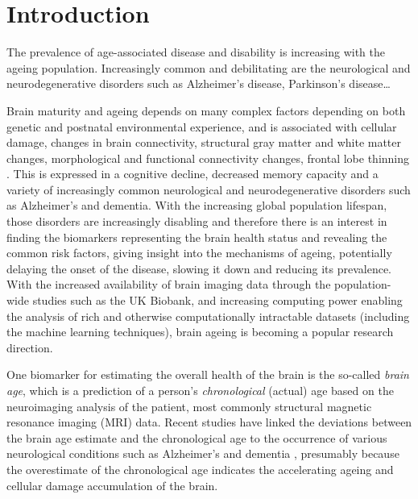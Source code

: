 \chapter{Introduction}


The prevalence of age-associated disease and disability is increasing with the ageing population. Increasingly common and debilitating are the neurological and neurodegenerative disorders such as Alzheimer's disease, Parkinson's disease\dots

Brain maturity and ageing depends on many complex factors depending on both genetic and postnatal environmental experience, and is associated with cellular damage, changes in brain connectivity, structural gray matter and white matter changes, morphological and functional connectivity changes, frontal lobe thinning \cite{cole2018brain, niu2019improved, franke2019ten}. This is expressed in a cognitive decline, decreased memory capacity and a variety of increasingly common neurological and neurodegenerative disorders such as Alzheimer's and dementia. With the increasing global population lifespan, those disorders are increasingly disabling and therefore there is an interest in finding the biomarkers representing the brain health status and revealing the common risk factors, giving insight into the mechanisms of ageing, potentially delaying the onset of the disease, slowing it down and reducing its prevalence. With the increased availability of brain imaging data through the population-wide studies such as the UK Biobank, and increasing computing power enabling the analysis of rich and otherwise computationally intractable datasets (including the machine learning techniques), brain ageing is becoming a popular research direction.

One biomarker for estimating the overall health of the brain is the so-called \textit{brain age}, which is a prediction of a person's \textit{chronological} (actual) age based on the neuroimaging analysis of the patient, most commonly structural magnetic resonance imaging (MRI) data. Recent studies have linked the deviations between the brain age estimate and the chronological age to the occurrence of various neurological conditions such as Alzheimer's and dementia \cite{kaufmann2019}, presumably because the overestimate of the chronological age indicates the accelerating ageing and cellular damage accumulation of the brain.


